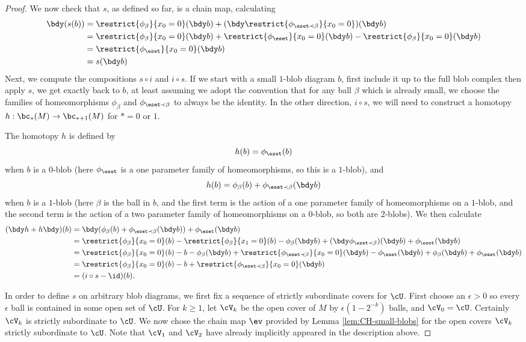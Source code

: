 \begin{proof}
We now check that $s$, as defined so far, is a chain map, calculating
\begin{align*}
\bdy (s(b)) & = \restrict{\phi_\beta}{x_0=0}(\bdy b) + (\bdy \restrict{\phi_{\eset \prec \beta}}{x_0=0})(\bdy b) \\
		 & = \restrict{\phi_\beta}{x_0=0}(\bdy b) + \restrict{\phi_\eset}{x_0=0}(\bdy b) - \restrict{\phi_\beta}{x_0=0}(\bdy b) \\
		 & = \restrict{\phi_\eset}{x_0=0}(\bdy b) \\
		 & = s(\bdy b)
\end{align*}
Next, we compute the compositions $s \circ i$ and $i \circ s$. If we start with a small $1$-blob diagram $b$, first include it up to the full blob complex then apply $s$, we get exactly back to $b$, at least assuming we adopt the convention that for any ball $\beta$ which is already small, we choose the families of homeomorphisms $\phi_\beta$ and $\phi_{\eset \prec \beta}$ to always be the identity. In the other direction, $i \circ s$, we will need to construct a homotopy $h:\bc_*(M) \to \bc_{*+1}(M)$ for $*=0$ or $1$.

The homotopy $h$ is defined by $$h(b) = \phi_\eset(b)$$ when $b$ is a $0$-blob (here $\phi_\eset$ is a one parameter family of homeomorphisms, so this is a $1$-blob), and $$h(b) = \phi_\beta(b) + \phi_{\eset \prec \beta}(\bdy b)$$ when $b$ is a $1$-blob (here $\beta$ is the ball in $b$, and the first term is the action of a one parameter family of homeomorphisms on a $1$-blob, and the second term is the action of a two parameter family of homeomorphisms on a $0$-blob, so both are $2$-blobs). We then calculate
\begin{align*}
(\bdy h+h \bdy)(b) & = \bdy (\phi_{\beta}(b) + \phi_{\eset \prec \beta}(\bdy b)) + \phi_\eset(\bdy b)  \\
	& =  \restrict{\phi_\beta}{x_0=0}(b) - \restrict{\phi_\beta}{x_1=0}(b) - \phi_\beta(\bdy b) + (\bdy \phi_{\eset \prec \beta})(\bdy b) + \phi_\eset(\bdy b) \\
	& =  \restrict{\phi_\beta}{x_0=0}(b) - b - \phi_\beta(\bdy b) + \restrict{\phi_{\eset \prec \beta}}{x_0=0}(\bdy b) -  \phi_\eset(\bdy b) + \phi_\beta(\bdy b) + \phi_\eset(\bdy b) \\
	& = \restrict{\phi_\beta}{x_0=0}(b) - b + \restrict{\phi_{\eset \prec \beta}}{x_0=0}(\bdy b) \\
	& = (i \circ s - \id)(b).
\end{align*}


In order to define $s$ on arbitrary blob diagrams, we first fix a sequence of strictly subordinate covers for $\cU$. First choose an $\epsilon > 0$ so every $\epsilon$ ball is contained in some open set of $\cU$. For $k \geq 1$, let $\cV_{k}$ be the open cover of $M$ by $\epsilon (1-2^{-k})$ balls, and $\cV_0 = \cU$. Certainly $\cV_k$ is strictly subordinate to $\cU$. We now chose the chain map $\ev$ provided by Lemma \ref{lem:CH-small-blobs} for the open covers $\cV_k$ strictly subordinate to $\cU$. Note that $\cV_1$ and $\cV_2$ have already implicitly appeared in the description above.


\end{proof}
